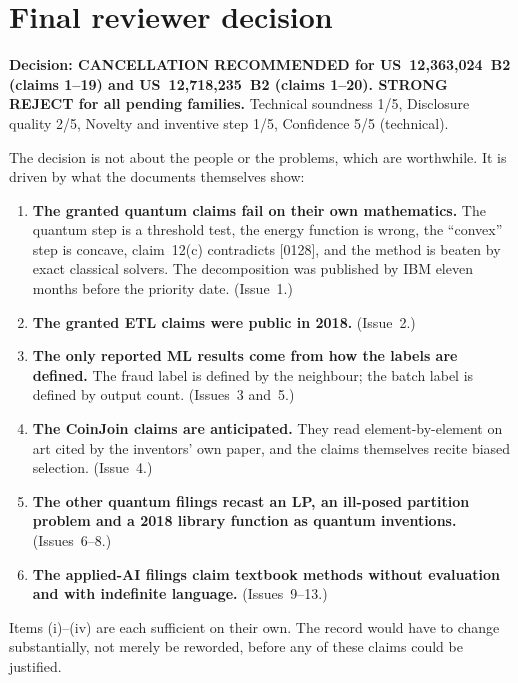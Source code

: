 \documentclass[10pt,a4paper]{article}
\begin{document}
\section{Final reviewer decision}\label{sec:decision}
\noindent\textbf{Decision: CANCELLATION RECOMMENDED for US~12,363,024~B2 (claims 1--19) and US~12,718,235~B2 (claims 1--20). STRONG REJECT for all pending families.} Technical soundness 1/5, Disclosure quality 2/5, Novelty and inventive step 1/5, Confidence 5/5 (technical).

\smallskip
\noindent The decision is not about the people or the problems, which are worthwhile. It is driven by what the documents themselves show:
\begin{enumerate}[label=(\roman*)]
  \item \textbf{The granted quantum claims fail on their own mathematics.} The quantum step is a threshold test, the energy function is wrong, the ``convex'' step is concave, claim~12(c) contradicts [0128], and the method is beaten by exact classical solvers. The decomposition was published by IBM eleven months before the priority date. (Issue~1.)
  \item \textbf{The granted ETL claims were public in 2018.} (Issue~2.)
  \item \textbf{The only reported ML results come from how the labels are defined.} The fraud label is defined by the neighbour; the batch label is defined by output count. (Issues~3 and~5.)
  \item \textbf{The CoinJoin claims are anticipated.} They read element-by-element on art cited by the inventors' own paper, and the claims themselves recite biased selection. (Issue~4.)
  \item \textbf{The other quantum filings recast an LP, an ill-posed partition problem and a 2018 library function as quantum inventions.} (Issues~6--8.)
  \item \textbf{The applied-AI filings claim textbook methods without evaluation and with indefinite language.} (Issues~9--13.)
\end{enumerate}
\noindent Items (i)--(iv) are each sufficient on their own. The record would have to change substantially, not merely be reworded, before any of these claims could be justified.

\end{document}
